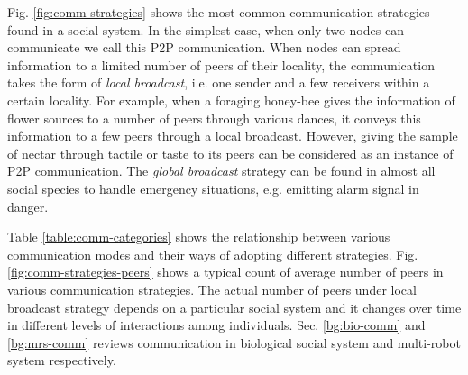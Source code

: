 Fig. \ref{fig:comm-strategies} shows the most common communication strategies found in a  social system.  In the simplest case, when only two nodes can communicate we call this P2P communication. When nodes can spread information to a limited number of peers of their locality, the communication takes the form of {\em local broadcast}, i.e. one sender and a few receivers within a certain locality. For example, when a foraging honey-bee gives the information of flower sources to a number of peers through various dances, it conveys this information to a few peers through a local broadcast. However, giving the sample of nectar through tactile or taste to its peers can be considered as an instance of P2P communication. The {\em global broadcast} strategy can be found in almost all social species to handle emergency situations, e.g. emitting alarm signal in danger.

Table \ref{table:comm-categories}  shows the relationship between various communication modes and their ways of adopting different strategies. Fig. \ref {fig:comm-strategies-peers} shows a typical count of average number of peers in various communication strategies. The actual number of peers under local broadcast strategy depends on a particular social system and it changes over time in different levels of interactions among individuals. Sec. \ref{bg:bio-comm} and \ref{bg:mrs-comm} reviews communication in biological social system  and multi-robot system respectively.
